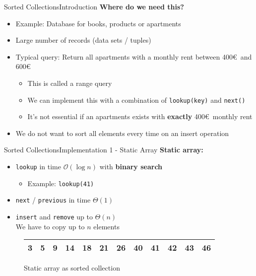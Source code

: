 \begin{frame}{Sorted Collections}{Introduction}
  \textbf{Where do we need this?}
  \begin{itemize}
    \item
      Example: Database for books, products or apartments
    \item
      Large number of records (data sets / tuples)
    \item
      Typical query: Return all apartments with a monthly rent between
      400\euro\, and 600\euro
      \begin{itemize}
        \item
          This is called a {\color{Mittel-Blau}range query}
        \item
          We can implement this with a combination of
          {\color{Mittel-Blau}\texttt{lookup(key)}} and
          {\color{Mittel-Blau}\texttt{next()}}
        \item
          It's not essential if an apartments exists with \textbf{exactly}
          400\euro\, monthly rent
      \end{itemize}
    \item
      We do not want to sort all elements every time on an 
      {\color{Mittel-Blau}insert} operation
  \end{itemize}
\end{frame}


\begin{frame}{Sorted Collections}{Implementation 1 - Static Array}
  \textbf{Static array:}
  \begin{itemize}
    \item
      {\color{Mittel-Blau}\texttt{lookup}} in time $\mathcal{O}(\log n)$ with
      \textbf{binary search}
      \begin{itemize}
        \item
          Example: {\color{Mittel-Blau}\texttt{lookup(41)}}
      \end{itemize}
    \item
      {\color{Mittel-Blau}\texttt{next}} /
      {\color{Mittel-Blau}\texttt{previous}} in time $\Theta(1)$
    \item
      {\color{Mittel-Blau}\texttt{insert}} and
      {\color{Mittel-Blau}\texttt{remove}} up to $\Theta(n)$\\
      We have to copy up to $n$ elements
  \end{itemize}
  \begin{figure}[!b]
    \begin{tabular}{|c|c|c|c|c|c|c|c|c|c|c|c|}
      \hline
      3 & 5 & 9 & 14 & 18 & 21 & 26 & 40 & 41 & 42 & 43 & 46\\
      \hline
    \end{tabular}
    \caption{Static array as sorted collection}
    \label{fig:sorted_collections:impl_static_array}
  \end{figure}
\end{frame}

